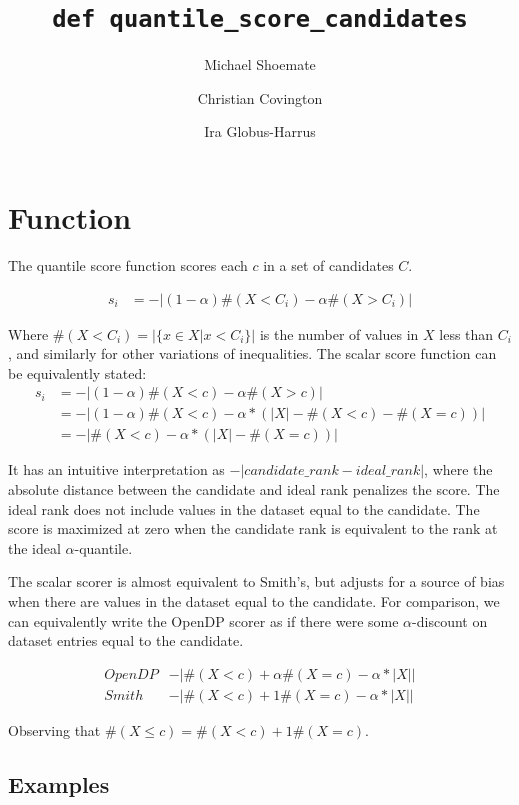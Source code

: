 \documentclass{article}
\title{\texttt{def quantile\_score\_candidates}}
\author{Michael Shoemate \and Christian Covington \and Ira Globus-Harrus}
\begin{document}
\maketitle

\section{Function}
The quantile score function scores each $c$ in a set of candidates $C$.

\begin{equation}
\begin{array}{rl}
    s_i &= -|(1 - \alpha) \#(X < C_i) - \alpha \#(X > C_i)|
\end{array}
\end{equation}

Where $\#(X < C_i) = |\{x \in X | x < C_i\}|$ is the number of values in $X$ less than $C_i$, 
and similarly for other variations of inequalities.
The scalar score function can be equivalently stated:
\begin{align}
    s_i &= -|(1 - \alpha) \#(X < c) - \alpha \#(X > c)| \\
    &= -|(1 - \alpha) \#(X < c) - \alpha * (|X| - \#(X < c) - \#(X = c))| \\
    &= -|\#(X < c) - \alpha * (|X| - \#(X = c))|
\end{align}

It has an intuitive interpretation as $-|candidate\_rank - ideal\_rank|$, 
where the absolute distance between the candidate and ideal rank penalizes the score.
The ideal rank does not include values in the dataset equal to the candidate.
The score is maximized at zero when the candidate rank is equivalent to the rank at the ideal $\alpha$-quantile.

The scalar scorer is almost equivalent to Smith's\cite{Smith11}, but adjusts for a source of bias when there are values in the dataset equal to the candidate.
For comparison, we can equivalently write the OpenDP scorer as if there were some $\alpha$-discount on dataset entries equal to the candidate.

\[
\begin{array}{cl}
    OpenDP &-|\#(X < c) + \alpha \#(X = c) - \alpha * |X|| \\
    Smith &-|\#(X < c) + 1 \#(X = c) - \alpha * |X||
\end{array}
\]

Observing that $\#(X \leq c) = \#(X < c) + 1 \#(X = c)$.


\subsection{Examples}
\end{document}
